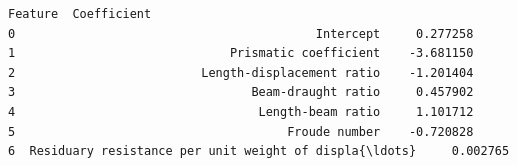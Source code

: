 \documentclass[1pt]{article}
\begin{document}
    \begin{Verbatim}[commandchars=\\\{\}]
                                             Feature  Coefficient
0                                          Intercept     0.277258
1                              Prismatic coefficient    -3.681150
2                          Length-displacement ratio    -1.201404
3                                 Beam-draught ratio     0.457902
4                                  Length-beam ratio     1.101712
5                                      Froude number    -0.720828
6  Residuary resistance per unit weight of displa{\ldots}     0.002765
    \end{Verbatim}


\end{document}
